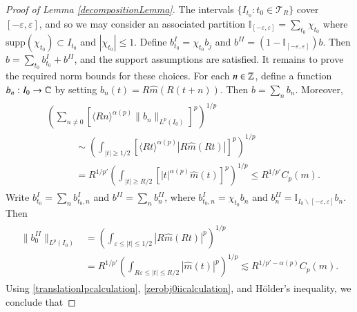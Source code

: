 \begin{proof} [Proof of Lemma \ref{decompositionLemma}]
    The intervals $\{ I_{t_0} : t_0 \in \mathcal{T}_R \}$ cover $[-\varepsilon,\varepsilon]$, and so we may consider an associated partition $\mathbb{I}_{[-\varepsilon,\varepsilon]} = \sum_{t_0} \chi_{t_0}$ where $\text{supp}(\chi_{t_0}) \subset I_{t_0}$ and $|\chi_{t_0}| \leq 1$. Define $b_{t_0}^I = \chi_{t_0} b_j$ and $b^{II} = (1 - \mathbb{I}_{[-\varepsilon,\varepsilon]} ) b$. Then $b = \sum_{t_0} b_{t_0}^I + b^{II}$, and the support assumptions are satisfied. It remains to prove the required norm bounds for these choices. For each $n \in \operatorname{\mathbb{Z}}$, define a function $b_{n}: I_0 \to \operatorname{\mathbb{C}}$ by setting $b_{n}(t) = R \widehat{m}(R (t + n))$. Then $b = \sum_n b_{n}$. Moreover,
    \begin{align} \label{translationlpcalculation}
    \begin{split}
        &\left( \sum_{n \neq 0} \left[ \langle R n \rangle^{\alpha(p)} \| b_{n} \|_{L^p(I_0)} \right]^p \right)^{1/p}\\
        &\quad\quad\quad \sim \left( \int_{|t| \geq 1/2} \left[ \langle R t \rangle^{\alpha(p)} |R \widehat{m}(R t)| \right]^p \right)^{1/p}\\
        &\quad\quad\quad = R^{1/p'} \left( \int_{|t| \geq R/2} \left[ |t|^{\alpha(p)} \widehat{m}(t) \right]^p \right)^{1/p} \leq R^{1/p'} C_p(m).
    \end{split}
    \end{align}
    Write $b_{t_0}^I = \sum_n b_{t_0,n}^I$ and $b^{II} = \sum_n b_{n}^{II}$, where $b_{t_0,n}^I = \chi_{t_0} b_n$ and $b_n^{II} = \mathbb{I}_{I_0 \smallsetminus [-\varepsilon, \varepsilon] } b_{n}$. Then
    \begin{align} \label{zerobj0iicalculation}
    \begin{split}
        \| b_{0}^{II} \|_{L^p(I_0)} &= \left( \int_{\varepsilon \leq |t| \leq 1/2} |R \widehat{m}(R t)|^p \right)^{1/p}\\
        &= R^{1/p'} \left( \int_{R \varepsilon \leq |t| \leq R/2} |\widehat{m}(t)|^p \right)^{1/p} \lesssim R^{1/p' - \alpha(p)} C_p(m).
    \end{split}
    \end{align}
    Using \eqref{translationlpcalculation}, \eqref{zerobj0iicalculation}, and H\"{o}lder's inequality, we conclude that

\end{proof}
